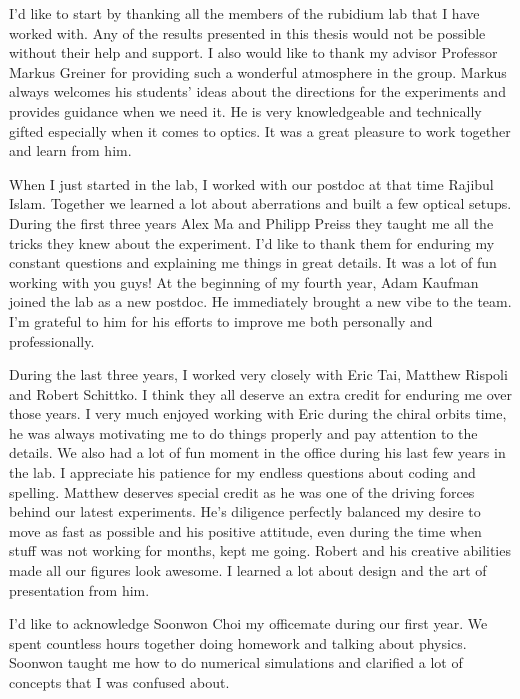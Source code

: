 
I'd like to start by thanking all the members of the rubidium lab that I have worked with. Any of the results presented in this thesis would not be possible without their help and support. I also would like to thank my advisor Professor Markus Greiner for providing such a wonderful atmosphere in the group. Markus always welcomes his students' ideas about the directions for the experiments and provides guidance when we need it. He is very knowledgeable and technically gifted especially when it comes to optics. It was a great pleasure to work together and learn from him.

When I just started in the lab, I worked with our postdoc at that time Rajibul Islam. Together we learned a lot about aberrations and built a few optical setups. During the first three years Alex Ma and Philipp Preiss they taught me all the tricks they knew about the experiment. I'd like to thank them for enduring my constant questions and explaining me things in great details. It was a  lot of fun working with you guys! At the beginning of my fourth year, Adam Kaufman joined the lab as a new postdoc. He immediately brought a new vibe to the team. I'm grateful to him for his efforts to improve me both personally and professionally.

During the last three years, I worked very closely with Eric Tai, Matthew Rispoli and Robert Schittko. I think they all deserve an extra credit for enduring me over those years. I very much enjoyed working with Eric during the chiral orbits time, he was always motivating me to do things properly and pay attention to the details. We also had a lot of fun moment in the office during his last few years in the lab. I appreciate his patience for my endless questions about coding and spelling. Matthew deserves special credit as he was one of the driving forces behind our latest experiments. He's diligence perfectly balanced my desire to move as fast as possible and his positive attitude, even during the time when stuff was not working for months, kept me going. Robert and his creative abilities made all our figures look awesome. I learned a lot about design and the art of presentation from him.

I'd like to acknowledge Soonwon Choi my officemate during our first year. We spent countless hours together doing homework and talking about physics. Soonwon taught me how to do numerical simulations and clarified a lot of concepts that I was confused about.


